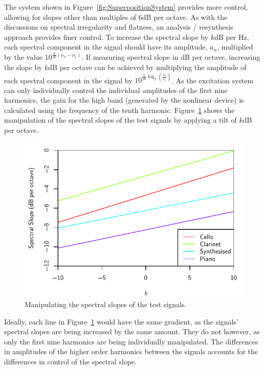 		The system shown in Figure~\ref{fig:SuperpositionSystem} provides more control, allowing for slopes other
		than multiples of 6dB per octave. As with the discussions on spectral irregularity and flatness, an
		analysis / resynthesis approach provides finer control. To increase the spectral slope by $k$dB per Hz,
		each spectral component in the signal should have its amplitude, $a_{n}$, multiplied by the value
		$10^{\frac{k}{20}(\nu_{n} - \nu_{1})}$. If measuring spectral slope in dB per octave, increasing the slope
		by $k$dB per octave can be achieved by multiplying the amplitude of each spectral component in the signal
		by $10^{\frac{k}{20}\log_{2} \left( \frac{\nu_{n}}{\nu_{1}} \right)}$. As the excitation system can only
		individually control the individual amplitudes of the first nine harmonics, the gain for the high band
		(generated by the nonlinear device) is calculated using the frequency of the tenth harmonic.
		Figure~\ref{fig:MoveSlopes} shows the manipulation of the spectral slopes of the test signals by applying a
		tilt of $k$dB per octave.

		\begin{figure}[h!]
			\centering
			\includegraphics{chapter6/Images/MoveSlopes.pdf}
			\caption{Manipulating the spectral slopes of the test signals.}
			\label{fig:MoveSlopes}
		\end{figure}

		Ideally, each line in Figure~\ref{fig:MoveSlopes} would have the same gradient, as the signals' spectral
		slopes are being increased by the same amount. They do not however, as only the first nine harmonics are
		being individually manipulated. The differences in amplitudes of the higher order harmonics between the
		signals accounts for the differences in control of the spectral slope.

